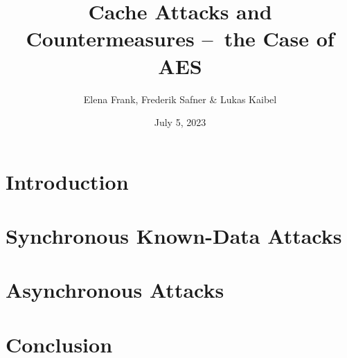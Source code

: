 \documentclass{article}
\title{\textbf{Cache Attacks and Countermeasures – the Case of AES}}
\author{Elena Frank, Frederik Safner \& Lukas Kaibel}
\date{July 5, 2023}
\begin{document}
\maketitle

\tableofcontents

\newpage

\section{Introduction}



\section{Synchronous Known-Data Attacks}


\section{Asynchronous Attacks}







\section{Conclusion}

\end{document}
